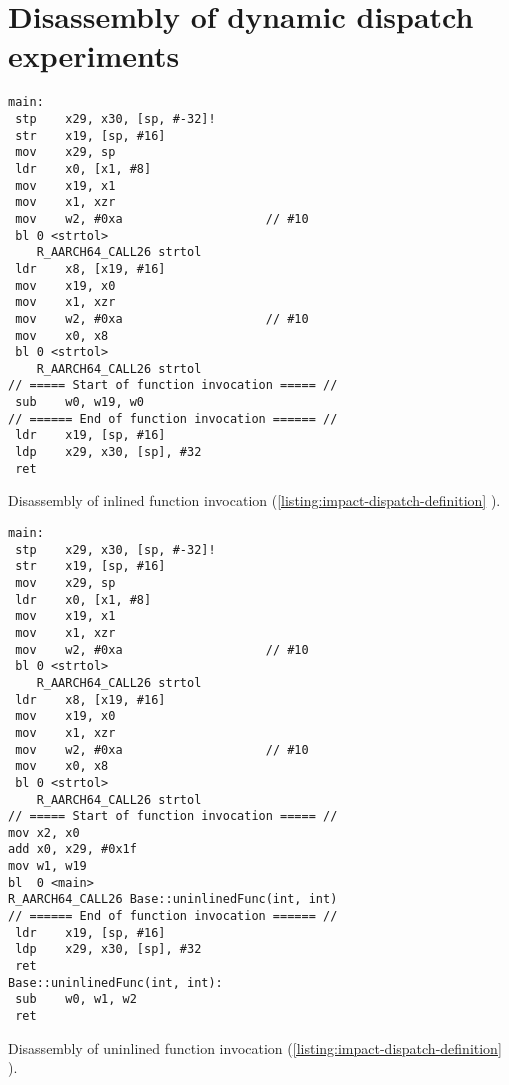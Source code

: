 \chapter{Disassembly of dynamic dispatch experiments}
\label{chap:impact-disassembly}


\vspace{2em}
\begin{code}
    \begin{verbatim}
main:
 stp	x29, x30, [sp, #-32]!
 str	x19, [sp, #16]
 mov	x29, sp
 ldr	x0, [x1, #8]
 mov	x19, x1
 mov	x1, xzr
 mov	w2, #0xa                   	// #10
 bl	0 <strtol>
    R_AARCH64_CALL26 strtol
 ldr	x8, [x19, #16]
 mov	x19, x0
 mov	x1, xzr
 mov	w2, #0xa                   	// #10
 mov	x0, x8
 bl	0 <strtol>
    R_AARCH64_CALL26 strtol
// ===== Start of function invocation ===== //
 sub	w0, w19, w0
// ====== End of function invocation ====== //
 ldr	x19, [sp, #16]
 ldp	x29, x30, [sp], #32
 ret
    \end{verbatim}
    \caption{Disassembly of inlined function invocation (\autoref{listing:impact-dispatch-definition} ).}
    \label{listing:impact-dispatch-inlined-disassembly}
\end{code}


\vspace{2em}
\begin{code}
    \begin{verbatim}
main:
 stp	x29, x30, [sp, #-32]!
 str	x19, [sp, #16]
 mov	x29, sp
 ldr	x0, [x1, #8]
 mov	x19, x1
 mov	x1, xzr
 mov	w2, #0xa                   	// #10
 bl	0 <strtol>
    R_AARCH64_CALL26 strtol
 ldr	x8, [x19, #16]
 mov	x19, x0
 mov	x1, xzr
 mov	w2, #0xa                   	// #10
 mov	x0, x8
 bl	0 <strtol>
    R_AARCH64_CALL26 strtol
// ===== Start of function invocation ===== //
mov	x2, x0
add	x0, x29, #0x1f
mov	w1, w19
bl	0 <main>
R_AARCH64_CALL26 Base::uninlinedFunc(int, int)
// ====== End of function invocation ====== //
 ldr	x19, [sp, #16]
 ldp	x29, x30, [sp], #32
 ret
Base::uninlinedFunc(int, int):
 sub	w0, w1, w2
 ret
    \end{verbatim}
    \caption{Disassembly of uninlined function invocation (\autoref{listing:impact-dispatch-definition} ).}
    \label{listing:impact-dispatch-uninlined-disassembly}
\end{code}


